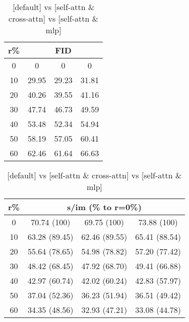 \begin{table}[htp]
\caption{[default] vs [self-attn \& cross-attn] vs [self-attn \& mlp]}
\label{table:exp_1_2}
    \begin{minipage}{0.4\textwidth}
        \begin{tabular}{|c||c|c|c|}
            \hline
            \multicolumn{1}{|c||}{r\%} & \multicolumn{3}{c|}{FID}\\
            \hline
            0 & 0 & 0 & 0 \\
            10 & 29.95 & 29.23 & 31.81 \\
            20 & 40.26 & 39.55 & 41.16 \\
            30 & 47.74 & 46.73 & 49.59 \\
            40 & 53.48 & 52.34 & 54.94 \\
            50 & 58.19 & 57.05 & 60.41 \\
            60 & 62.46 & 61.64 & 66.63 \\
            \hline
        \end{tabular}
    \end{minipage}
    \begin{minipage}{0.4\textwidth}
        \begin{tabular}{|c||c|c|c|}
            \hline
            \multicolumn{1}{|c||}{r\%} & \multicolumn{3}{c|}{s/im (\% to r=0\%)}\\
            \hline
            0 & 70.74 (100) & 69.75 (100) & 73.88 (100) \\
            10 & 63.28 (89.45) & 62.46 (89.55) & 65.41 (88.54) \\
            20 & 55.64 (78.65) & 54.98 (78.82) & 57.20 (77.42) \\
            30 & 48.42 (68.45) & 47.92 (68.70) & 49.41 (66.88) \\
            40 & 42.97 (60.74) & 42.02 (60.24) & 42.83 (57.97) \\
            50 & 37.04 (52.36) & 36.23 (51.94) & 36.51 (49.42) \\
            60 & 34.35 (48.56) & 32.93 (47.21) & 33.08 (44.78) \\
            \hline
        \end{tabular}
    \end{minipage}
\end{table}